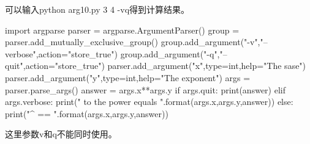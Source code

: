 可以输入python arg10.py 3 4 -vq得到计算结果。
\begin{python}
import argparse
parser = argparse.ArgumentParser()
group = parser.add_mutually_exclusive_group()
group.add_argument("-v","--verbose",action="store_true")
group.add_argument("-q","--quit",action="store_true")
parser.add_argument("x",type=int,help="The sase")
parser.add_argument("y",type=int,help="The exponent")
args = parser.parse_args()
answer = args.x**args.y
if args.quit:
    print(answer)
elif args.verbose:
    print("{} to the power {} equals {}".format(args.x,args.y,answer))
else:
    print("{}^{} == {}".format(args.x,args.y,answer))
\end{python}
这里参数v和q不能同时使用。

